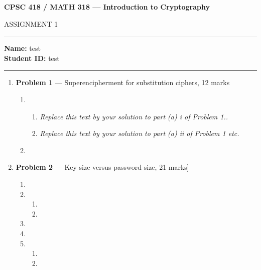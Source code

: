 \documentclass[11pt]{article}
\theoremstyle{definition}
\begin{document}
\begin{center}
{\bf \Large CPSC 418 / MATH 318 --- Introduction to Cryptography

ASSIGNMENT 1 %
}
\end{center}

\hrule 	

\textbf{Name:} test  \\
\textbf{Student ID:} test 

\medskip \hrule

\begin{enumerate}

\item[] \textbf{Problem 1} --- Superencipherment for substitution ciphers, 12 marks

\begin{enumerate}
\item
\begin{enumerate}
\item \emph{Replace this text by your solution to part (a) i of Problem 1..}

\item \emph{Replace this text by your solution to part (a) ii of Problem 1 etc.}
\end{enumerate}

\item
\end{enumerate}


\item[] \textbf{Problem 2} --- Key size versus password size, 21 marks]



\begin{enumerate}
\item
\item

\begin{enumerate}
\item
\item
\end{enumerate}

\item

\item

\item
\begin{enumerate}
\item

\item
\end{enumerate}
\end{enumerate}




\end{enumerate}
\end{document}
